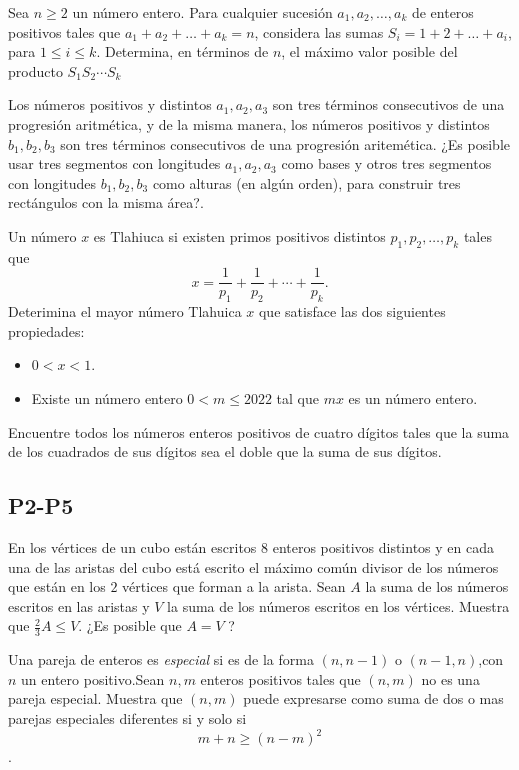 \documentclass[11pt]{scrartcl}
\begin{document}
\begin{problem}
[2018/4] Sea $n\geq 2$ un número entero. Para cualquier sucesión $a_1,a_2,\ldots,a_k$ de enteros positivos tales que $a_1+a_2+\ldots+a_k=n$, considera las sumas $S_i=1+2+\ldots+a_i$, para $1\leq i \leq k$. Determina, en términos de $n$, el máximo valor posible del producto $S_1S_2\cdots S_k$
\end{problem}

\begin{problem}
[2021/1] Los números positivos y distintos $a_1,a_2,a_3$ son tres términos consecutivos de una progresión aritmética, y de la misma manera, los números positivos y distintos $b_1,b_2,b_3$ son tres términos consecutivos de una progresión aritemética. ¿Es posible usar tres segmentos con longitudes $a_1,a_2,a_3$ como bases y otros tres segmentos con longitudes $b_1,b_2,b_3$ como alturas (en algún orden), para construir tres rectángulos con la misma área?.
\end{problem}
\begin{problem}
    [2022/1] 
    Un número $x$ es Tlahiuca si existen primos positivos distintos $p_1,p_2,\dots,p_k$ tales que 
\[x=\frac{1}{p_1}+\frac{1}{p_2}+\cdots+\frac{1}{p_k}.\]
Deterimina el mayor número Tlahuica $x$ que satisface las dos siguientes propiedades:
 \begin{itemize} 
 \item  $0< x < 1$. 
 \item  Existe un número entero $0< m\leq 2022$ tal que $mx$ es un número entero. 
 \end{itemize} 
\end{problem}

\begin{problem} [2023/1]
    Encuentre todos los números enteros positivos de cuatro dígitos tales que la suma de los cuadrados de sus dígitos sea el doble que la suma de sus dígitos.
\end{problem}
\subsection{P2-P5}
\begin{problem} [2008/5]

    En los vértices de un cubo están escritos $8$ enteros positivos distintos y en cada una de
las aristas del cubo está escrito el máximo común divisor de los números que están en los
$2$ vértices que forman a la arista. Sean $A$ la suma de los números escritos en las aristas y
$V$ la suma de los números escritos en los vértices. Muestra que $\frac 23 A \leq V$. ¿Es posible que $A = V$ ?
    
\end{problem}
\begin{problem}
[2013/5] Una pareja de enteros es \textit{especial} si es de la forma $(n,n-1)$ o $(n-1,n)$,con $n$ un entero positivo.Sean $n,m$ enteros positivos tales que $(n,m)$ no es una pareja especial. Muestra que $(n,m)$ puede expresarse como suma de dos o mas parejas especiales diferentes si y solo si $$m+n \geq (n-m)^2$$.
\end{problem}
\end{document}
